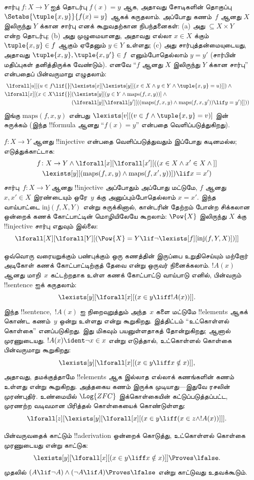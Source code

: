 \documentclass[../../../include/open-logic-section]{subfiles}
\begin{document}
சார்பு $f \colon X \to Y$ ஐத் தொடர்பு $f(x) = y$ ஆக, அதாவது சோடிகளின்
தொகுப்பு~$\Setabs{\tuple{x,y}}{f(x) = y}$ ஆகக் கருதலாம். அப்போது
கணம்~$f$ ஆனது $X$ இலிருந்து $Y$ க்கான சார்பு எனக் கூறுவதற்கான
நிபந்தனைகள்: (a) அது $\subseteq X \times Y$ என்ற தொடர்பு; (b) அது
முழுமையானது, அதாவது எல்லா $x \in X$ க்கும்
$\tuple{x, y} \in f$ ஆகும் ஏதேனும் $y \in Y$ உள்ளது; (c) அது
சார்புத்தன்மையுடையது, அதாவது $\tuple{x, y}, \tuple{x, y'} \in f$
எனும்போதெல்லாம் $y = y'$ (சார்பின் மதிப்புகள் தனித்திருக்க வேண்டும்).
எனவே ``$f$ ஆனது $X$ இலிருந்து $Y$ க்கான சார்பு'' என்பதைப் பின்வருமாறு
எழுதலாம்:
\begin{align*}
 \lforall[u][(u \in f \lif {}] & \lexists[x][\lexists[y][(x \in X \land y \in
      Y \land \tuple{x, y} = u)]]) \land {}\\
 \lforall[x][(x \in X \lif {}] &
      (\lexists[y][(y \in Y \land \mathrm{maps}(f, x, y))] \land {}\\
& (\lforall[y][\lforall[y'][((\mathrm{maps}(f, x, y) \land
    \mathrm{maps}(f, x, y')) \lif y = y')]]))
\end{align*}
இங்கு $\mathrm{maps}(f, x, y)$ என்பது
$\lexists[v][(v \in f \land \tuple{x, y} = v)]$ இன் சுருக்கம்
(இந்த !!{formula} ஆனது ``$f(x) = y$'' என்பதை வெளிப்படுத்துகிறது).

$f\colon X \to Y$ ஆனது !!{injective} என்பதை வெளிப்படுத்துவதும் இப்போது
கடினமல்ல; எடுத்துக்காட்டாக:
\begin{multline*}
 f \colon X \to Y \land \lforall[x][\lforall[x'][((x \in X \land x' \in
     X \land {}]] \\
 \lexists[y][(\mathrm{maps}(f, x, y) \land \mathrm{maps}(f,
        x', y))]) \lif x = x')
\end{multline*}
சார்பு~$f\colon X \to Y$ ஆனது !!{injective} அப்போதும் அப்போது மட்டுமே, $f$ ஆனது
$x, x' \in X$ இரண்டையும் ஒரே~$y$ க்கு அனுப்பும்போதெல்லாம் $x = x'$.
இந்த வாய்பாட்டை $\mathrm{inj}(f, X, Y)$ என்று சுருக்கினால், கான்டரின்
தேற்றம் போன்ற சிக்கலான ஒன்றைக் கணக் கோட்பாட்டின் மொழியிலேயே கூறலாம்:
$\Pow{X}$ இலிருந்து $X$ க்கு !!{injective} சார்பு எதுவும் இல்லை:
\[
\lforall[X][\lforall[Y][(\Pow{X} = Y \lif
    \lnot\lexists[f][\mathrm{inj}(f, Y, X)])]]
\]

ஒவ்வொரு வரையறுக்கும் பண்புக்கும் ஒரு கணத்தின் இருப்பை உறுதிசெய்யும்
மற்றோர் அடிகோள் கணக் கோட்பாட்டிற்குத் தேவை என்று ஒருவர் நினைக்கலாம்.
$!A(x)$ ஆனது மாறி~$x$ கட்டற்றதாக உள்ள கணக் கோட்பாட்டு வாய்பாடு எனில்,
பின்வரும் !!{sentence} ஐக் கருதலாம்:
\[
\lexists[y][\lforall[x][(x \in y \liff !A(x))]].
\]
இந்த !!{sentence},~$!A(x)$ ஐ நிறைவுறுத்தும் அந்த~$x$ களை மட்டுமே
!!{element}s ஆகக் கொண்ட கணம்~$y$ ஒன்று உள்ளது என்று கூறுகிறது.
இத்திட்டம் ``உட்கொள்ளல் கொள்கை'' எனப்படுகிறது. இது மிகவும் பயனுள்ளதாகத்
தோன்றுகிறது; ஆனால் முரணுடையது. $!A(x) \ident \lnot x \in x$ என்று
எடுத்தால், உட்கொள்ளல் கொள்கை பின்வருமாறு கூறுகிறது:
\[
\lexists[y][\lforall[x][(x \in y \liff x \notin x)]],
\]
அதாவது, தமக்குத்தாமே !!{element}s ஆக இல்லாத எல்லாக் கணங்களின் கணம்
உள்ளது என்று கூறுகிறது. அத்தகைய கணம் இருக்க முடியாது---இதுவே ரசலின்
முரண்புதிர். உண்மையில் $\Log{ZFC}$ இக்கொள்கையின் கட்டுப்படுத்தப்பட்ட,
முரணற்ற வடிவமான பிரித்தல் கொள்கையைக் கொண்டுள்ளது:
\[
\lforall[z][\lexists[y][\lforall[x][(x \in y \liff (x \in z \land
      !A(x))]]].
\]

\begin{prob}
பின்வருவதைக் காட்டும் !!a{derivation} ஒன்றைக் கொடுத்து, உட்கொள்ளல்
கொள்கை முரணுடையது என்று காட்டுக:
\[
\lexists[y][\lforall[x][(x \in y \liff x \notin x)]] \Proves \lfalse.
\]
முதலில் $(A \lif \lnot A) \land (\lnot A \lif A)
\Proves \lfalse$ என்று காட்டுவது உதவக்கூடும்.
\end{prob}
\end{document}
